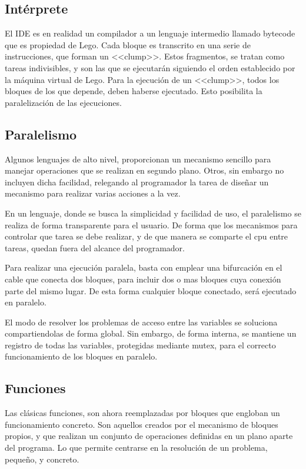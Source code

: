 \documentclass[12pt,a4paper]{article}
\begin{document}
\subsection{Intérprete}
El IDE es en realidad un compilador a un lenguaje intermedio llamado bytecode 
que es propiedad de Lego. Cada bloque es transcrito en una serie de 
instrucciones, que forman un <<clump>>. Estos fragmentos, se tratan como tareas 
indivisibles, y son las que se ejecutarán siguiendo el orden establecido por la 
máquina virtual de Lego. Para la ejecución de un <<clump>>, todos los bloques de 
los que depende, deben haberse ejecutado. Esto posibilita la paralelización de 
las ejecuciones.

\subsection{Paralelismo}
Algunos lenguajes de alto nivel, proporcionan un mecanismo sencillo para manejar 
operaciones que se realizan en segundo plano. Otros, sin embargo no incluyen 
dicha facilidad, relegando al programador la tarea de diseñar un mecanismo para 
realizar varias acciones a la vez.

En un lenguaje, donde se busca la simplicidad y facilidad de uso, el paralelismo 
se realiza de forma transparente para el usuario. De forma que los mecanismos 
para controlar que tarea se debe realizar, y de que manera se comparte el cpu 
entre tareas, quedan fuera del alcance del programador.

Para realizar una ejecución paralela, basta con emplear una bifurcación en el 
cable que conecta dos bloques, para incluir dos o mas bloques cuya conexión 
parte del mismo lugar. De esta forma cualquier bloque conectado, será ejecutado 
en paralelo.

El modo de resolver los problemas de acceso entre las variables se soluciona 
compartiendolas de forma global. Sin embargo, de forma interna, se mantiene un 
registro de todas las variables, protegidas mediante mutex, para el correcto 
funcionamiento de los bloques en paralelo.

\subsection{Funciones}
Las clásicas funciones, son ahora reemplazadas por bloques que engloban un 
funcionamiento concreto. Son aquellos creados por el mecanismo de bloques 
propios, y que realizan un conjunto de operaciones definidas en un plano aparte 
del programa. Lo que permite centrarse en la resolución de un problema, pequeño, 
y concreto.
\end{document}
